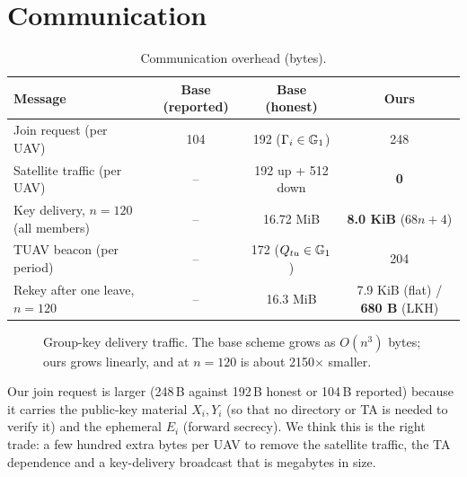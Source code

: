 \section{Communication}
\begin{table}[H]
\centering\small
\caption{Communication overhead (bytes).}
\label{tab:comm}
\begin{tabularx}{\linewidth}{@{}>{\raggedright\arraybackslash}X ccc@{}}
\toprule
Message & Base (reported) & Base (honest) & \textbf{Ours}\\
\midrule
Join request (per UAV) & 104 & 192 ($\Gamma_i\in\mathbb{G}_1$) & 248\\
Satellite traffic (per UAV) & -- & 192 up + 512 down & \textbf{0}\\
Key delivery, $n=120$ (all members) & -- & 16.72 MiB & \textbf{8.0 KiB} ($68n+4$)\\
TUAV beacon (per period) & -- & 172 ($Q_{tu}\in\mathbb{G}_1$) & 204\\
Rekey after one leave, $n=120$ & -- & 16.3 MiB & 7.9 KiB (flat) \;/\; \textbf{680 B} (LKH)\\
\bottomrule
\end{tabularx}
\end{table}

\begin{figure}[H]
\centering
{}
\caption{Group-key delivery traffic. The base scheme grows as $O(n^3)$ bytes; ours grows linearly, and at $n=120$ is about 2150$\times$ smaller.}
\label{fig:keybytes}
\end{figure}

\begin{whybox}[title={The trade-off we accept}]
Our join request is larger (248\,B against 192\,B honest or 104\,B reported) because it carries the public-key material $X_i,Y_i$ (so that no directory or TA is
needed to verify it) and the ephemeral $E_i$ (forward secrecy). We think this is the right trade: a few hundred extra bytes per UAV to remove the satellite traffic,
the TA dependence and a key-delivery broadcast that is megabytes in size.
\end{whybox}

